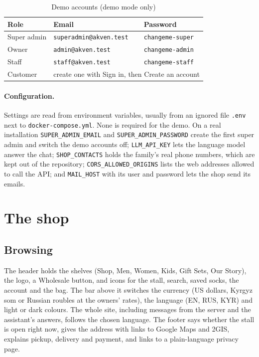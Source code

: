 \begin{table}[!htbp]
	\centering
	\begin{tabular}{l l l}
		\toprule
		\textbf{Role} & \textbf{Email} & \textbf{Password} \\
		\midrule
		Super admin & \texttt{superadmin@akven.test} & \texttt{changeme-super} \\
		Owner & \texttt{admin@akven.test} & \texttt{changeme-admin} \\
		Staff & \texttt{staff@akven.test} & \texttt{changeme-staff} \\
		Customer & \multicolumn{2}{l}{create one with Sign in, then Create an account} \\
		\bottomrule
	\end{tabular}
	\caption{Demo accounts (demo mode only)}
	\label{tab:demo}
\end{table}

\paragraph{Configuration.}
\label{sec:config}
Settings are read from environment variables, usually from an ignored file \texttt{.env} next to
\texttt{docker-compose.yml}. None is required for the demo. On a real installation \texttt{SUPER\_ADMIN\_EMAIL} and
\texttt{SUPER\_ADMIN\_PASSWORD} create the first super admin and switch the demo accounts off;
\texttt{LLM\_API\_KEY} lets the language model answer the chat; \texttt{SHOP\_CONTACTS} holds the family's real phone
numbers, which are kept out of the repository; \texttt{CORS\_ALLOWED\_ORIGINS} lists the web addresses allowed to call
the API; and \texttt{MAIL\_HOST} with its user and password lets the shop send its emails.

\section{The shop}
\label{sec:shop}

\subsection{Browsing}

The header holds the shelves (Shop, Men, Women, Kids, Gift Sets, Our Story), the logo, a Wholesale button, and icons
for the stall, search, saved socks, the account and the bag. The bar above it switches the currency (US dollars, Kyrgyz
som or Russian roubles at the owners' rates), the language (EN, RUS, KYR) and light or dark colours. The whole site,
including messages from the server and the assistant's answers, follows the chosen language. The footer says whether
the stall is open right now, gives the address with links to Google Maps and 2GIS, explains pickup, delivery and
payment, and links to a plain-language privacy page.

